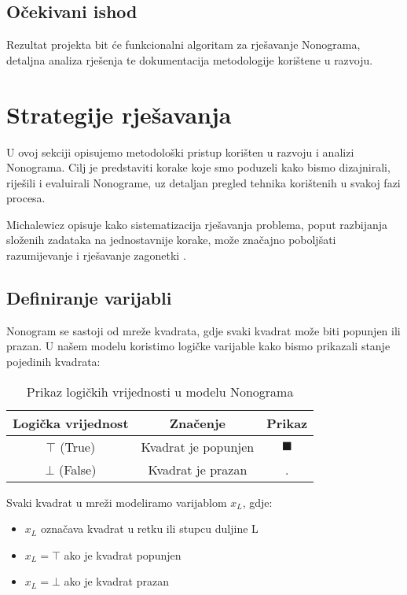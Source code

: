 \documentclass[a4paper,12pt]{article}
\begin{document}
\subsection{Očekivani ishod}
Rezultat projekta bit će funkcionalni algoritam za rješavanje Nonograma, detaljna analiza rješenja te dokumentacija metodologije korištene u razvoju.

\section{Strategije rješavanja}
U ovoj sekciji opisujemo metodološki pristup korišten u razvoju i analizi Nonograma. Cilj je predstaviti korake koje smo poduzeli kako bismo dizajnirali, riješili i evaluirali Nonograme, uz detaljan pregled tehnika korištenih u svakoj fazi procesa.

Michalewicz opisuje kako sistematizacija rješavanja problema, poput razbijanja složenih zadataka na jednostavnije korake, može značajno poboljšati razumijevanje i rješavanje zagonetki \cite{knjiga2}.

\subsection{Definiranje varijabli}
Nonogram se sastoji od mreže kvadrata, gdje svaki kvadrat može biti popunjen ili prazan. U našem modelu koristimo logičke varijable kako bismo prikazali stanje pojedinih kvadrata:

\begin{table}[h]
    \centering
    \begin{tabular}{|c|c|c|}
        \hline
        Logička vrijednost & Značenje & Prikaz \\
        \hline
        $\top$ (True)  & Kvadrat je popunjen & $\blacksquare$ \\
        $\bot$ (False) & Kvadrat je prazan & . \\
        \hline
    \end{tabular}
    \caption{Prikaz logičkih vrijednosti u modelu Nonograma}
    \label{tab:logicke-vrijednosti}
\end{table}

Svaki kvadrat u mreži modeliramo varijablom $x_{L}$, gdje:
\begin{itemize}
    \item $x_{L}$ označava kvadrat u retku ili stupcu duljine L
    \item $x_{L} = \top$ ako je kvadrat popunjen
    \item $x_{L} = \bot$ ako je kvadrat prazan
\end{itemize}
\end{document}
